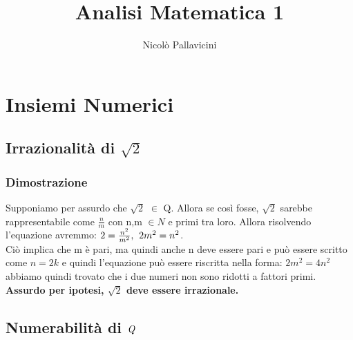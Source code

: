 \documentclass[11pt, a4paper]{article}
\author{Nicolò Pallavicini}
\title{Analisi Matematica 1}
\begin{document}
\maketitle
\newpage
\section{Insiemi Numerici}
\subsection{Irrazionalità di $\sqrt{2}$}
\subsubsection*{Dimostrazione}
Supponiamo per assurdo che $\sqrt{2}$ $\in$ Q. Allora se così fosse, $\sqrt{2}$ sarebbe rappresentabile come $\frac{n}{m}$ con n,m $\in{N}$ e primi tra loro. Allora risolvendo l'equazione avremmo: \begin{math}
2=\frac{n^2}{m^2},$\hspace{0.2cm}$2m^2=n^2
\end{math}.
\\
Ciò implica che m è pari, ma quindi anche n deve essere pari e può essere scritto come \begin{math} n=2k \end{math}
e quindi l'equazione può essere riscritta nella forma: \begin{math} 2m^2=4n^2 \end{math} abbiamo quindi trovato che i due numeri non sono ridotti a fattori primi. \textbf{Assurdo per ipotesi, $\sqrt{2}$ deve essere irrazionale.}

\subsection{Numerabilità di $\emph{Q}$}
\end{document}
